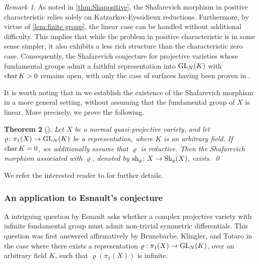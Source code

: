 \documentclass[english]{amsproc}
\theoremstyle{plain}
\newtheorem{thm}{Theorem}[section]
\theoremstyle{definition}
\theoremstyle{remark}
\newtheorem{rem}[thm]{Remark}
\theoremstyle{plain}
\numberwithin{equation}{thm} %
\newcommand{\GL}{{\rm GL}}
\begin{document}
\begin{rem}
	As noted in \cref{thm:Shapositive}, the Shafarevich morphism in positive characteristic relies solely on Katzarkov-Eyssidieux reductions. Furthermore, by virtue of \cref{lem:finite group}, the linear case can be handled without additional difficulty. This implies that while the problem in positive characteristic is in some sense simpler, it also exhibits a less rich structure than the characteristic zero case. Consequently, the Shafarevich conjecture for projective varieties whose fundamental groups admit a faithful representation into $\GL_{N}(K)$ with ${\rm char}\, K>0$  remains open, with only the case of surfaces having been proven in \cite{DY23b}.
\end{rem}




It is worth noting that in \cite{DY23,DY23b} we establish the existence of the Shafarevich morphism in a more general setting, without assuming that the fundamental group of  $X$ is linear. More precisely, we prove the following. 
\begin{thm}[\cite{DY23,DY23b}]\label{thm:Shafarevich}
	Let  $X$ be a normal quasi-projective variety, and let
	$\varrho\colon \pi_1(X)\to \GL_N(K)$ be a representation, where $K$ is an arbitrary field. 
	If ${\rm char}\,K=0$, we additionally assume that $\varrho$ is reductive. 
	Then the Shafarevich morphism associated with $\varrho$, denoted by 
	${\rm sh}_\varrho\colon X\to {\rm Sh}_\varrho(X)$, exists. \qed
\end{thm}
We refer the interested reader to \cite{DY23,DY23b} for further details.


\subsubsection{An application to Esnault's conjecture}  
A intriguing question by Esnault asks whether a complex projective variety with infinite fundamental group must admit non-trivial symmetric differentials. This question was first answered affirmatively by Brunebarbe, Klingler, and Totaro \cite{BKT13} in the case where there exists a representation $\varrho:\pi_1(X)\to \GL_N(K)$, over an arbitrary field $K$, such that $\varrho(\pi_1(X))$ is infinite.
\end{document}

